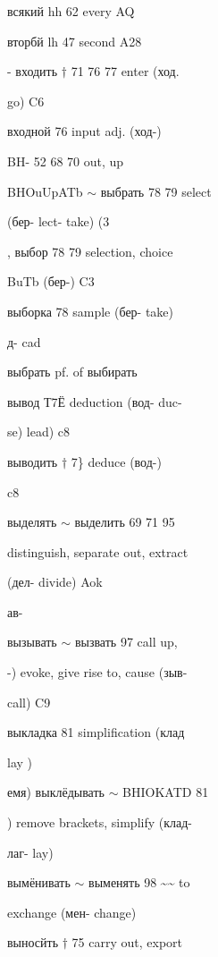 \begin{minipage}[t]{0.475\textwidth}
\raggedright
\noindent всякий hh 62 every AQ\par
\noindent вторбй lh 47 second A28\par
\noindent - входить $\dagger$ 71 76 77 enter (ход.\par
\noindent go) C6\par
\noindent входной 76 input adj. (ход-)\par
\noindent BH- 52 68 70 out, up\par
\noindent BHOuUpATb $\sim$ выбрать 78 79 select\par
{} (бер- lect- take) (3\par
\noindent , выбор 78 79 selection, choice\par
\noindent BuTb  (бер-) C3\par
\noindent выборка 78 sample (бер- take)\par
\noindent д- cad\par
\noindent выбрать pf. of выбирать\par
{} вывод Т7Ё deduction (вод- duc-\par
\noindent se) lead) c8\par
\noindent выводить $\dagger$ 7\} deduce (вод-)\par
\noindent c8\par
\noindent выделять $\sim$ выделить 69 71 95\par
\noindent distinguish, separate out, extract\par
\noindent (дел- divide) Aok\par
\noindent ав-\par
\noindent вызывать $\sim$ вызвать 97 call up,\par
\noindent -) evoke, give rise to, cause (зыв-\par
\noindent call) C9\par
\noindent выкладка 81 simplification (клад\par
\noindent lay )\par
\noindent емя) выклёдывать $\sim$ BHIOKATD 81\par
{}) remove brackets, simplify (клад-\par
\noindent лаг- lay)\par
\noindent вымёнивать $\sim$ выменять 98 \textasciitilde{}\textasciitilde{} to\par
\noindent exchange (мен- change)\par
\noindent выносйть $\dagger$ 75 carry out, export\par

\end{minipage}
